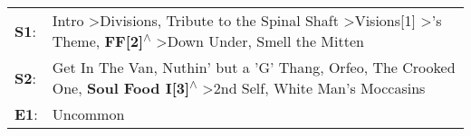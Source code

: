 \begin{supertabular}{p{0.03\textwidth}p{0.92\textwidth}}
 \textbf{S1}:  &  Intro\textsuperscript{} \textgreater \enspace Divisions\textsuperscript{}, \enspace Tribute to the Spinal Shaft\textsuperscript{} \textgreater \enspace Visions[1]\textsuperscript{} \textgreater {}'s Theme\textsuperscript{}, \enspace \textbf{FF[2]\textsuperscript{$\wedge$}} \textgreater \enspace Down Under\textsuperscript{}, \enspace Smell the Mitten\textsuperscript{}  \enspace  \\
 \textbf{S2}:  &                                                           Get In The Van\textsuperscript{}, \enspace Nuthin' but a 'G' Thang\textsuperscript{}, \enspace Orfeo\textsuperscript{}, \enspace The Crooked One\textsuperscript{}, \enspace \textbf{Soul Food I[3]\textsuperscript{$\wedge$}} \textgreater \enspace 2nd Self\textsuperscript{}, \enspace White Man's Moccasins\textsuperscript{}  \enspace  \\
 \textbf{E1}:  &                                                                                                                                                                                                                                                                                                                                                                  Uncommon\textsuperscript{}  \enspace  \\
\end{supertabular}
